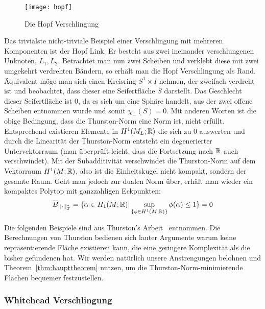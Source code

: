         \begin{wrapfigure}{r}{0.4\textwidth}
            \centering
            \texttt{[image: hopf]}
            \caption{Die Hopf Verschlingung}
            \label{fig:hopf}
        \end{wrapfigure}
        Das trivialste nicht-triviale Beispiel einer Verschlingung mit mehreren Komponenten ist der Hopf Link. Er besteht aus zwei ineinander verschlungenen Unknoten, $L_1, L_2$. Betrachtet man nun zwei Scheiben und verklebt diese mit zwei umgekehrt verdrehten Bändern, so erhält man die Hopf Verschlingung als Rand. Äquivalent möge man sich einen Kreisring $S^1 \times I$ nehmen, der zweifach verdreht ist und beobachtet, dass dieser eine Seifertfläche $S$ darstellt. Das Geschlecht dieser Seifertfläche ist $0$, da es sich um eine Sphäre handelt, aus der zwei offene Scheiben entnommen wurde und somit $\chi_-(S)=0$. Mit anderen Worten ist die obige Bedingung, dass die Thurston-Norm eine Norm ist, nicht erfüllt. Entsprechend existieren Elemente in $H^1(M_L;\mathbb{R})$ die sich zu 0 auswerten und durch die Linearität der Thurston-Norm entsteht ein degenerierter Untervektorraum (man überprüft leicht, dass die Fortsetzung nach $\mathbb{R}$ auch verschwindet). Mit der Subadditivität verschwindet die Thurston-Norm auf dem Vektorraum $H^1(M;\mathbb{R})$, also ist die Einheitskugel nicht kompakt, sondern der gesamte Raum. Geht man jedoch zur dualen Norm über, erhält man wieder ein kompaktes Polytop mit ganzzahligen Eckpunkten: 
        \[
              \overline B_{||\cdot||_T^*}= \{\alpha \in H_1(M;\mathbb{R})| \sup_{\{\phi \in H^1(M;\mathbb{R})\}} \phi(\alpha)\leq 1\}=0
        \] 

        Die folgenden Beispiele sind aus Thurston's Arbeit~\cite{Thurston.1986} entnommen. Die Berechnungen von Thurston bedienen sich lauter Argumente warum keine repräsentierende Fläche existieren kann, die eine geringere Komplexität als die bisher gefundenen hat. Wir werden natürlich unsere Anstrengungen belohnen und Theorem~\ref{thm:haupttheorem} nutzen, um die Thurston-Norm-minimierende Flächen bequemer festzustellen.

        \subsubsection*{Whitehead Verschlingung}

